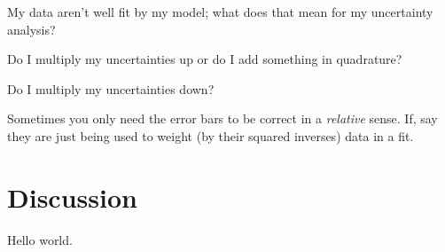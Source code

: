\documentclass[12pt, letterpaper]{article}
\begin{document}
My data aren't well fit by my model; what does that mean for my uncertainty
analysis?

Do I multiply my uncertainties up or do I add something in quadrature?

Do I multiply my uncertainties down?

Sometimes you only need the error bars to be correct in a
\emph{relative} sense. If, say they are just being used to weight (by
their squared inverses) data in a fit.

\section{Discussion}

Hello world.
\end{document}
